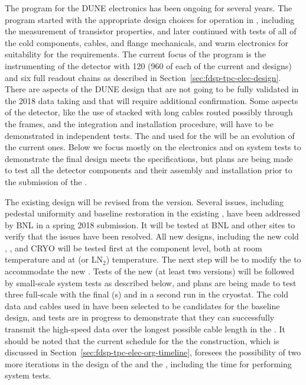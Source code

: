The  program for the DUNE  electronics has been ongoing for several years.  The  program started with the appropriate design choices for operation
in \lar, including the measurement of transistor properties, and later
continued with tests of all of the cold components, cables, \fdth and flange mechanicals, and warm electronics for suitability for the  requirements.  The current focus of the  program is the instrumenting of the  detector with \num{120}  (\num{960} of each of the current  and   designs) and six full  readout chains as described in Section~\ref{sec:fdsp-tpc-elec-design}. There are aspects of the DUNE design that are not going to be fully validated in the 2018  data taking and that will require additional confirmation. Some aspects of the detector, like the use of stacked  with long cables routed possibly through the  frames, and the integration and installation procedure, will have to be demonstrated in independent tests. The  and  used for the  will be an evolution of the current  ones. Below we focus mostly on the electronics and on system tests to demonstrate the final design meets the  specifications, but plans are being made to test all the detector components and their assembly and installation prior to the submission of the .

The existing  design will be revised from the  version. Several issues, 
including pedestal uniformity and baseline restoration in the existing , have been 
addressed by BNL in a spring 2018 submission. It will be tested at BNL and other sites to 
verify that the issues have been resolved. All new  designs, including the new cold , , and CRYO will be tested first at the component level, both at room temperature and at \lar (or LN$_2$) temperature. The next step will be to modify the  to accommodate the new .  Tests of the new  (at least two versions) will be followed by small-scale system tests as described below, and plans are being made to test three full-scale  with the final (s) and  in a second run in the  cryostat.  The cold data and  cables used in  have been selected to be candidates for the  baseline design, and tests are in progress to demonstrate that they can successfully transmit the high-speed data over the longest possible cable length in the . It should be noted that the current schedule for the the  construction, which is discussed in Section~\ref{sec:fdsp-tpc-elec-org-timeline}, foresees the possibility of two more iterations in the design of the  and the , including the time for performing system tests.

